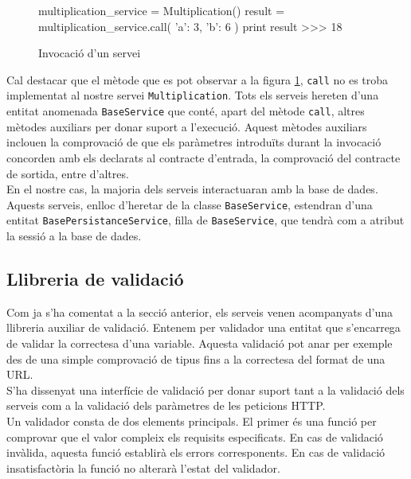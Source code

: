 		\begin{figure}[h!]
		\begin{python}
multiplication_service = Multiplication()
result = multiplication_service.call({
	'a': 3,
	'b': 6
})
print result
>>> 18
		\end{python}
		\caption{Invocació d'un servei}
		\label{fig:invocacio_servei}
	\end{figure}
	
	Cal destacar que el mètode que es pot observar a la figura \ref{fig:invocacio_servei}, \texttt{call} no es troba implementat al nostre servei \texttt{Multiplication}. Tots els serveis hereten d'una entitat anomenada \texttt{BaseService} que conté, apart del mètode \texttt{call}, altres mètodes auxiliars per donar suport a l'execució. Aquest mètodes auxiliars inclouen la comprovació de que els paràmetres introduïts durant la invocació concorden amb els declarats al contracte d'entrada, la comprovació del contracte de sortida, entre d'altres.\\
	
	En el nostre cas, la majoria dels serveis interactuaran amb la base de dades. Aquests serveis, enlloc d'heretar de la classe \texttt{BaseService}, estendran d'una entitat \texttt{BasePersistanceService}, filla de \texttt{BaseService}, que tendrà com a atribut la sessió a la base de dades.

	\subsection{Llibreria de validació} \label{validacio}
	
	Com ja s'ha comentat a la secció anterior, els serveis venen acompanyats d'una llibreria auxiliar de validació. Entenem per validador una entitat que s'encarrega de validar la correctesa d'una variable. Aquesta validació pot anar per exemple des de una simple comprovació de tipus fins a la correctesa del format de una \ac{URL}. \\
	
	S'ha dissenyat una interfície de validació per donar suport tant a la validació dels serveis com a la validació dels paràmetres de les peticions \ac{HTTP}.\\
	
	Un validador consta de dos elements principals. El primer és una funció per comprovar que el valor compleix els requisits especificats. En cas de validació invàlida, aquesta funció establirà els errors corresponents. En cas de validació insatisfactòria la funció no alterarà l'estat del validador.\\
	
